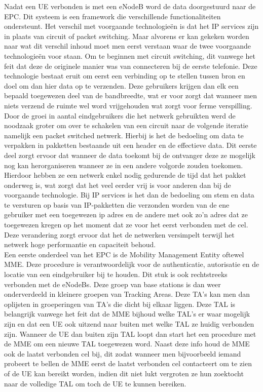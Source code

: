 Nadat een UE verbonden is met een eNodeB word de data doorgestuurd naar de EPC. Dit systeem is een framework die verschillende functionaliteiten ondersteunt. Het verschil met voorgaande technologieën is dat het IP services zijn in plaats van circuit of packet switching. \autocite{Awati2024} Maar alvorens er kan gekeken worden naar wat dit verschil inhoud moet men eerst verstaan waar de twee voorgaande technologieën voor staan. Om te beginnen met circuit switching, dit vanwege het feit dat deze de originele manier was van connecteren bij de eerste telefonie. Deze technologie bestaat eruit om eerst een verbinding op te stellen tussen bron en doel om dan hier data op te verzenden. Deze gebruikers krijgen dan elk een bepaald toegewezen deel van de bandbreedte, wat er voor zorgt dat wanneer men niets verzend de ruimte wel word vrijgehouden wat zorgt voor ferme verspilling. Door de groei in aantal eindgebruikers die het netwerk gebruikten werd de noodzaak groter om over te schakelen van een circuit naar de volgende iteratie namelijk een packet switched netwerk. Hierbij is het de bedoeling om data te verpakken in pakketten bestaande uit een header en de effectieve data. Dit eerste deel zorgt ervoor dat wanneer de data toekomt bij de ontvanger deze ze mogelijk nog kan herorganiseren wanneer ze in een andere volgorde zouden toekomen. Hierdoor hebben ze een netwerk enkel nodig gedurende de tijd dat het pakket onderweg is, wat zorgt dat het veel eerder vrij is voor anderen dan bij de voorgaande technologie. \autocite{BasuMallick2022} Bij IP services is het dan de bedoeling om stem en data te versturen op basis van IP-pakketten die verzonden worden van de ene gebruiker met een toegewezen ip adres en de andere met ook zo'n adres dat ze toegewezen kregen op het moment dat ze voor het eerst verbonden met de cel. Deze verandering zorgt ervoor dat het de netwerken versimpelt terwijl het netwerk hoge performantie en capaciteit behoud. \autocite{Awati2024} \\

Een eerste onderdeel van het EPC is de Mobility Management Entity oftewel MME. Deze procedure is verantwoordelijk voor de authenticatie, autorisatie en de locatie van een eindgebruiker bij te houden. Dit stuk is ook rechtstreeks verbonden met de eNodeBs. Deze groep van base stations is dan weer onderverdeeld in kleinere groepen van Tracking Areas. Deze TA's kan men dan oplijsten in groeperingen van TA's die dicht bij elkaar liggen. Deze TAL is belangrijk vanwege het feit dat de MME bijhoud welke TAL's er waar mogelijk zijn en dat een UE ook uitzend naar buiten met welke TAL ze huidig verbonden zijn. Wanneer de UE dan buiten zijn TAL loopt dan start het een procedure met de MME om een nieuwe TAL toegewezen word. Naast deze info houd de MME ook de laatst verbonden cel bij, dit zodat wanneer men bijvoorbeeld iemand probeert te bellen de MME eerst de laatst verbonden cel contacteert om te zien of de UE kan bereikt worden, indien dit niet lukt vergroten ze hun zoektocht naar de volledige TAL om toch de UE te kunnen bereiken. \autocite{Liou2013} \\

